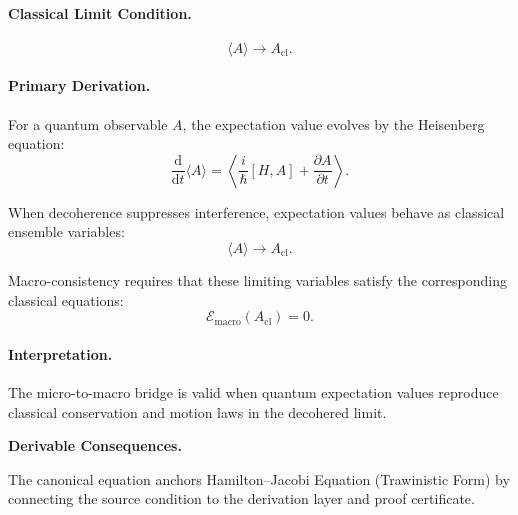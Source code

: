 \paragraph{Classical Limit Condition.}
\begin{equation}
\langle A\rangle
\longrightarrow
A_{\mathrm{cl}} .
\end{equation}

\paragraph{Primary Derivation.}
For a quantum observable $A$, the expectation value evolves by the Heisenberg equation:
\begin{equation}
\frac{\mathrm{d}}{\mathrm{d}t}\langle A\rangle
=
\left\langle
\frac{i}{\hbar}[H,A]
+
\frac{\partial A}{\partial t}
\right\rangle .
\end{equation}

When decoherence suppresses interference, expectation values behave as classical ensemble variables:
\begin{equation}
\langle A\rangle
\rightarrow
A_{\mathrm{cl}}.
\end{equation}

Macro-consistency requires that these limiting variables satisfy the corresponding classical equations:
\begin{equation}
\boxed{
\mathcal{E}_{\mathrm{macro}}(A_{\mathrm{cl}})=0 .
}
\end{equation}

\paragraph{Interpretation.}
The micro-to-macro bridge is valid when quantum expectation values reproduce classical conservation and motion laws in the decohered limit.

\par\vspace{0.35em}
\noindent\textbf{Derivable Consequences.}\quad
\begingroup
\footnotesize
\raggedright
The canonical equation anchors Hamilton--Jacobi Equation (Trawinistic Form) by connecting the source condition to the derivation layer and proof certificate.
\par\endgroup

